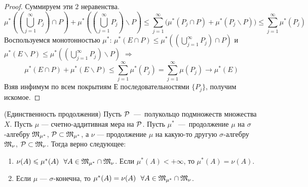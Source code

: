 \begin{proof}
    Суммируем эти $2$ неравенства.
    \[
    \mu^*\left((\bigcup\limits_{j = 1}^{\infty}{P_j}) \cap P\right)  + \mu^*\left((\bigcup\limits_{j = 1}^{\infty}{P_j})\backslash P\right) \leq \sum\limits_{j = 1}^{\infty}{}\Bigg(\mu^*(P_j \cap P) + \mu^*(P_j \backslash P)\Bigg) \leq \sum\limits_{j = 1}^{\infty}{\mu^*(P_j)}
    \]
    Воспользуемся монотонностью $\mu^*$: $
    \mu^*(E \cap P) \leq \mu^*\left((\bigcup\limits_{j = 1}^{\infty}{P_j}) \cap P\right)$  и $
    \mu^*(E \backslash P) \leq \mu^*\left((\bigcup\limits_{j = 1}^{\infty}{P_j})\backslash P\right) $ $\Longrightarrow$
    \[
    \mu^*(E \cap P) + \mu^*(E \backslash P) \leq \sum\limits_{j = 1}^{\infty}{\mu^*(P_j)} = \sum\limits_{j = 1}^{\infty}{\mu(P_j)} \longrightarrow \mu^{*}(E)
    \]
    Взяв инфимум по всем покрытиям Е последовательностями $\{P_j\}$, получим искомое.
\end{proof}
\begin{theorem} (Единственность продолжения)
    Пусть $\mathcal{P}$~---~полукольцо подмножеств множества $X$. Пусть $\mu$ --- счетно-аддитивная мера на $\mathcal{P}$. Пусть $\mu^*$~---~продолжение $\mu$ на $\sigma$-алгебру $\mathfrak{M}_{\mu^*}$, $\mathcal{P} \subset \mathfrak{M}_{\mu^*}$, а $\nu$ --- продолжение $\mu$ на какую-то другую $\sigma$-алгебру $\mathfrak{M}_{\nu}$, $\mathcal{P} \subset \mathfrak{M}_{\nu}$. Тогда верно следующее:
    \begin{enumerate}
        \item $\nu(A) \leqslant \mu^*(A)~~\forall A \in \mathfrak{M}_{\mu^*} \cap \mathfrak{M}_{\nu}$. Если $\mu^*(A) < +\infty$, то $\mu^*(A) = \nu(A)$.
        \item Если $\mu$ --- $\sigma$-конечна, то $\mu^*(A) = \nu(A)~~\forall A \in \mathfrak{M}_{\mu^*} \cap \mathfrak{M}_{\nu}$.
    \end{enumerate}
\end{theorem}
